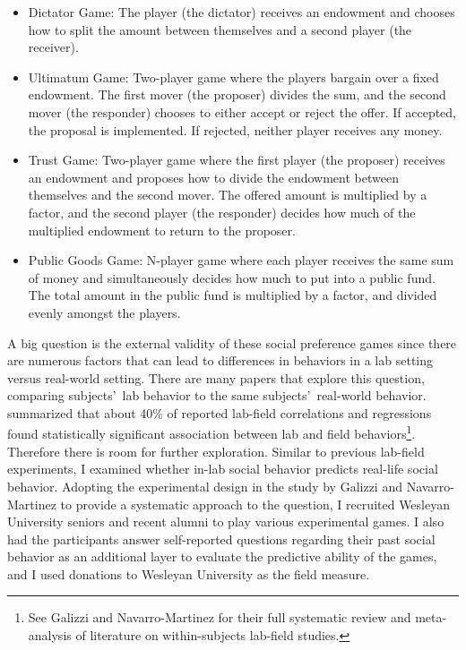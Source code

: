 \documentclass[12pt]{article}
\begin{document}
\begin{itemize}

\item{Dictator Game}: The player (the dictator) receives an endowment and chooses how to split the amount between themselves and a second player (the receiver).
\item{Ultimatum Game}: Two-player game where the players bargain over a fixed endowment. The first mover (the proposer) divides the sum, and the second mover (the responder) chooses to either accept or reject the offer. If accepted, the proposal is implemented. If rejected, neither player receives any money.
\item{Trust Game}: Two-player game where the first player (the proposer) receives an endowment and proposes how to divide the endowment between themselves and the second mover. The offered amount is multiplied by a factor, and the second player (the responder) decides how much of the multiplied endowment to return to the proposer. 
\item{Public Goods Game}: N-player game where each player receives the same sum of money and simultaneously decides how much to put into a public fund. The total amount in the public fund is multiplied by a factor, and divided evenly amongst the players. \end{itemize}

A big question is the external validity of these social preference games since there are numerous factors that can lead to differences in behaviors in a lab setting versus real-world setting. There are many papers that explore this question, comparing subjects\rq \ lab behavior  to the same subjects\rq \ real-world behavior. \cite{galizzi_navarro-martinez_2017} summarized that about 40\% of reported lab-field correlations and regressions found statistically significant association between lab and field behaviors\footnote{See Galizzi and Navarro-Martinez for their full systematic review and meta-analysis of literature on within-subjects lab-field studies.}. Therefore there is room for further exploration. Similar to previous lab-field experiments, I examined whether in-lab social behavior predicts real-life social behavior. Adopting the experimental design in the study by Galizzi and Navarro-Martinez to provide a systematic approach to the question, I recruited Wesleyan University seniors and recent alumni to play various experimental games. I also had the participants answer self-reported questions regarding their past social behavior as an additional layer to evaluate the predictive ability of the games, and I used donations to Wesleyan University as the field measure.
\end{document}
